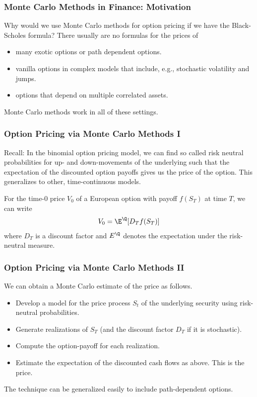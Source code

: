 \begin{frame}[fragile]
\frametitle{Monte Carlo Methods in Finance: Motivation}
Why would we use Monte Carlo methods for option pricing if we have the
Black-Scholes formula? There usually are no formulas for the prices of
\begin{itemize}
  \item many exotic options or path dependent options.
  \item vanilla options in complex models that include, e.g., stochastic
  volatility and jumps.
  \item options that depend on multiple correlated assets.
\end{itemize}
Monte Carlo methods work in all of these settings.
\end{frame}

\begin{frame}[fragile]
\frametitle{Option Pricing via Monte Carlo Methods I}
Recall: In the binomial option pricing model, we can find so
called risk neutral probabilities for up- and down-movements of the underlying
such that the  expectation of the discounted option payoffs gives us the price
of the option. This generalizes to other, time-continuous models.

For the time-$0$ price $V_0$ of a European option with payoff $f(S_T)$ at time
$T$, we can write
\begin{align*}
  V_0 = \E^\mathbb{\Q}[D_T f(S_T)]
\end{align*}
where $D_T$ is a discount factor and $E^\mathbb{\Q}$ denotes the expectation
under the risk-neutral measure.
\end{frame}

\begin{frame}[fragile]
\frametitle{Option Pricing via Monte Carlo Methods II}
We can obtain a Monte Carlo estimate of the price as follows.
\begin{itemize}
  \item Develop a model for the price process $S_t$ of the underlying security
  using risk-neutral probabilities.
  \item Generate realizations of $S_T$ (and the discount factor $D_T$ if it is
  stochastic).
  \item Compute the option-payoff for each realization.
  \item Estimate the expectation of the discounted cash flows as above. This is
  the price.
\end{itemize}
The technique can be generalized easily to include path-dependent options.
\end{frame}


